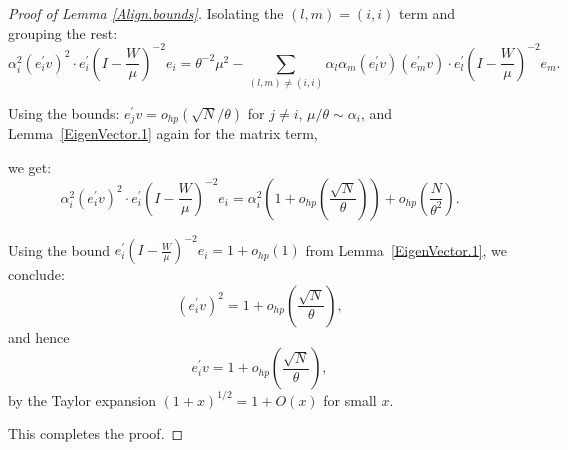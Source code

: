 \documentclass[11pt, reqno]{amsart}
\numberwithin{equation}{section}
\begin{document}
\begin{proof}[Proof of Lemma \ref{Align.bounds}]
Isolating the \( (l,m) = (i,i) \) term and grouping the rest:
\[
\alpha_i^2 (e_i^\prime v)^2 \cdot e_i^\prime \left(I - \frac{W}{\mu}\right)^{-2} e_i 
= \theta^{-2} \mu^2 - \sum_{(l,m) \ne (i,i)} \alpha_l \alpha_m (e_l^\prime v)(e_m^\prime v) \cdot e_l^\prime \left(I - \frac{W}{\mu}\right)^{-2} e_m.
\]

Using the bounds:
\( e_j^\prime v = o_{hp}(\sqrt{N}/\theta) \) for \( j \ne i \),   \( \mu/\theta \sim \alpha_i \), and  Lemma~\ref{EigenVector.1} again for the matrix term,

we get:
\[
\alpha_i^2 (e_i^\prime v)^2 \cdot e_i^\prime \left(I - \frac{W}{\mu}\right)^{-2} e_i 
= \alpha_i^2 \left(1 + o_{hp}\left( \frac{\sqrt{N}}{\theta} \right)\right) + o_{hp}\left( \frac{N}{\theta^2} \right).
\]

Using the bound \( e_i^\prime \left(I - \frac{W}{\mu} \right)^{-2} e_i = 1 + o_{hp}(1) \) from Lemma~\ref{EigenVector.1}, we conclude:
\[
(e_i^\prime v)^2 = 1 + o_{hp}\left( \frac{\sqrt{N}}{\theta} \right),
\]
and hence
\[
e_i^\prime v = 1 + o_{hp}\left( \frac{\sqrt{N}}{\theta} \right),
\]
by the Taylor expansion \( (1 + x)^{1/2} = 1 + O(x) \) for small \( x \).

\smallskip
This completes the proof.
\end{proof}
\end{document}
